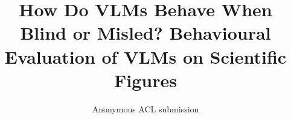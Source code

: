 \documentclass[11pt]{article}
\title{How Do VLMs Behave When Blind or Misled? Behavioural Evaluation of VLMs on Scientific Figures}
\author{Anonymous ACL submission}
\begin{document}
\maketitle

\begin{abstract}

\end{abstract}























\end{document}
